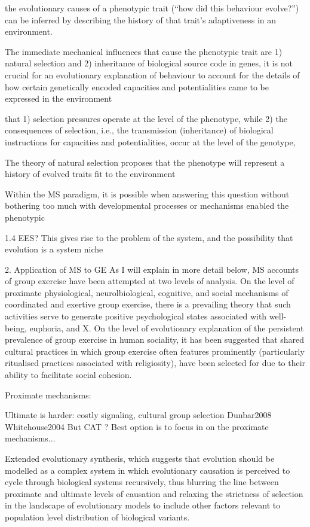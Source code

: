 the evolutionary causes of a phenotypic trait (``how did this behaviour evolve?'') can be inferred by describing the history of that trait's adaptiveness in an environment.

The immediate mechanical influences that cause the phenotypic trait are 1) natural selection and 2) inheritance of biological source code in genes, it is not crucial for an evolutionary explanation of behaviour to account for the details of how certain genetically encoded capacities and potentialities came to be expressed in the environment

 that 1) selection pressures operate at the level of the phenotype, while 2) the consequences of selection, i.e., the transmission (inheritance) of biological instructions for capacities and potentialities, occur at the level of the genotype,

The theory of natural selection proposes that the phenotype will represent a history of evolved traits fit to the environment

Within the MS paradigm, it is possible when answering this question without bothering too much with developmental processes or mechanisms enabled the phenotypic



1.4  EES?
This gives rise to the problem of the system, and the possibility that evolution is a system niche


2. Application of MS to GE
As I will explain in more detail below, MS accounts of group exercise have been attempted at two levels of analysis.  On the level of proximate physiological, neurolbiological, cognitive, and social mechanisms of coordinated and exertive group exercise, there is a prevailing theory that such activities serve to generate positive psychological states associated with well-being, euphoria, and X. On the level of evolutionary explanation of the persistent prevalence of group exercise in human sociality, it has been suggested that shared cultural practices in which group exercise often features prominently (particularly ritualised practices associated with religiosity), have been selected for  due to their ability to facilitate social cohesion.

Proximate mechanisms:

Ultimate is harder:
costly signaling,
cultural group selection
    Dunbar2008
    Whitehouse2004
But CAT ?
Best option is to focus in on the proximate mechanisms...



Extended evolutionary synthesis,
which suggests that evolution should be modelled as a complex system in which evolutionary causation is perceived to cycle through biological systems recursively, thus blurring the line between proximate and ultimate levels of causation and relaxing the strictness of selection in the landscape of evolutionary models to include other factors relevant to population level distribution of biological variants.

